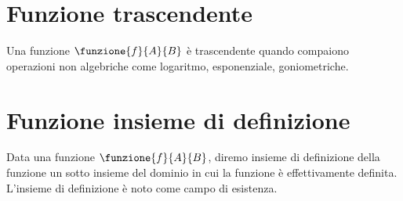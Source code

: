 \section{Funzione trascendente}
	Una funzione $\funzione{f}{A}{B}$  è trascendente quando compaiono operazioni non algebriche come logaritmo, esponenziale, goniometriche.
\section{Funzione insieme di definizione}
Data una funzione $\funzione{f}{A}{B}$, diremo insieme di definizione della funzione un sotto insieme del dominio in cui la funzione è effettivamente definita. L'insieme di definizione è noto come campo di esistenza.

\begin{center}
	
\end{center}